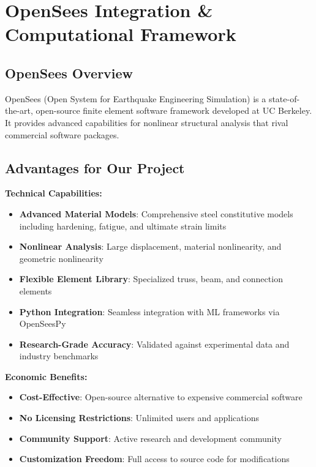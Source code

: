 \documentclass[12pt,a4paper]{article}
\begin{document}
\section{OpenSees Integration \& Computational Framework}

\subsection{OpenSees Overview}

OpenSees (Open System for Earthquake Engineering Simulation) is a state-of-the-art, open-source finite element software framework developed at UC Berkeley. It provides advanced capabilities for nonlinear structural analysis that rival commercial software packages.

\subsection{Advantages for Our Project}

\textbf{Technical Capabilities:}
\begin{itemize}
    \item \textbf{Advanced Material Models}: Comprehensive steel constitutive models including hardening, fatigue, and ultimate strain limits
    \item \textbf{Nonlinear Analysis}: Large displacement, material nonlinearity, and geometric nonlinearity
    \item \textbf{Flexible Element Library}: Specialized truss, beam, and connection elements
    \item \textbf{Python Integration}: Seamless integration with ML frameworks via OpenSeesPy
    \item \textbf{Research-Grade Accuracy}: Validated against experimental data and industry benchmarks
\end{itemize}

\textbf{Economic Benefits:}
\begin{itemize}
    \item \textbf{Cost-Effective}: Open-source alternative to expensive commercial software
    \item \textbf{No Licensing Restrictions}: Unlimited users and applications
    \item \textbf{Community Support}: Active research and development community
    \item \textbf{Customization Freedom}: Full access to source code for modifications
\end{itemize}
\end{document}
